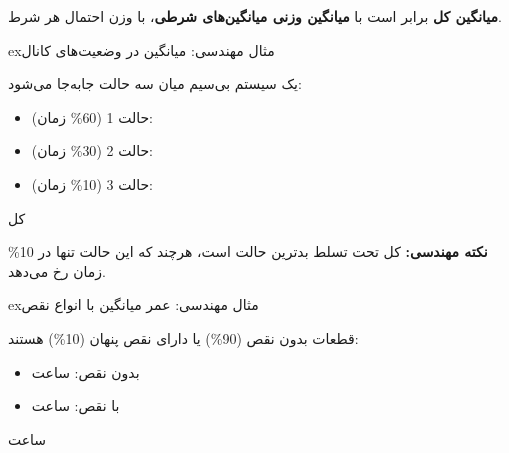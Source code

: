
\PSbr{}\PSbr{}\PSbr{}


\textbf{میانگین کل} برابر است با \textbf{میانگین وزنی میانگین‌های شرطی}، با وزن احتمال هر شرط.

\begin{PSbox}[unbreakable]{ex}{مثال مهندسی: میانگین  در وضعیت‌های کانال}

یک سیستم بی‌سیم میان سه حالت جابه‌جا می‌شود:

\begin{itemize}
\tightlist
\item
  حالت 1 (60\% زمان): 
\item
  حالت 2 (30\% زمان): 
\item
  حالت 3 (10\% زمان): 
\end{itemize}

 کل \PSbr{}

\textbf{نکته مهندسی:}  کل تحت تسلط بدترین حالت است، هرچند که این حالت تنها در 10\% زمان رخ می‌دهد.

\end{PSbox}

\begin{PSbox}[unbreakable]{ex}{مثال مهندسی: عمر میانگین با انواع نقص}

قطعات بدون نقص (90\%) یا دارای نقص پنهان (10\%) هستند:

\begin{itemize}
\tightlist
\item
  بدون نقص:  ساعت
\item
  با نقص:  ساعت
\end{itemize}

 ساعت

\end{PSbox}


